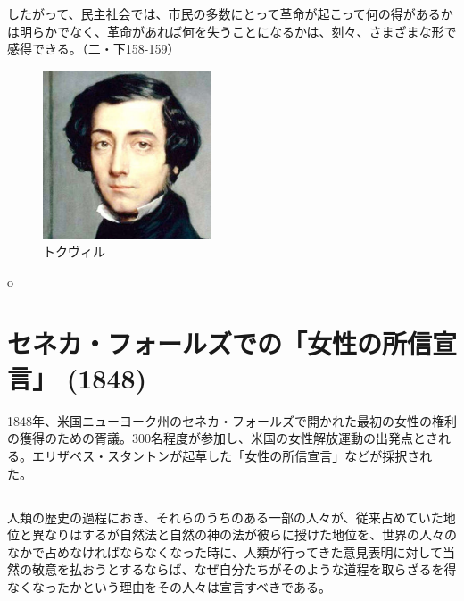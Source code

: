 したがって、民主社会では、市民の多数にとって革命が起こって何の得があるかは明らかでなく、革命があれば何を失うことになるかは、刻々、さまざまな形で感得できる。（二・下158-159）



     \begin{figure}[htbp]
       \centering
         \includegraphics[width=50mm]{images/tocqueville.jpg}
       \caption{トクヴィル}
     \end{figure}



o

\section{セネカ・フォールズでの「女性の所信宣言」  (1848)}

\label{sentiment}

1848年、米国ニューヨーク州のセネカ・フォールズで開かれた最初の女性の権利の獲得のための胥議。300名程度が参加し、米国の女性解放運動の出発点とされる。エリザベス・スタントンが起草した「女性の所信宣言」などが採択された。

\subsection{}




人類の歴史の過程におき、それらのうちのある一部の人々が、従来占めていた地位と異なりはするが自然法と自然の神の法が彼らに授けた地位を、世界の人々のなかで占めなければならなくなった時に、人類が行ってきた意見表明に対して当然の敬意を払おうとするならば、なぜ自分たちがそのような道程を取らざるを得なくなったかという理由をその人々は宣言すべきである。

